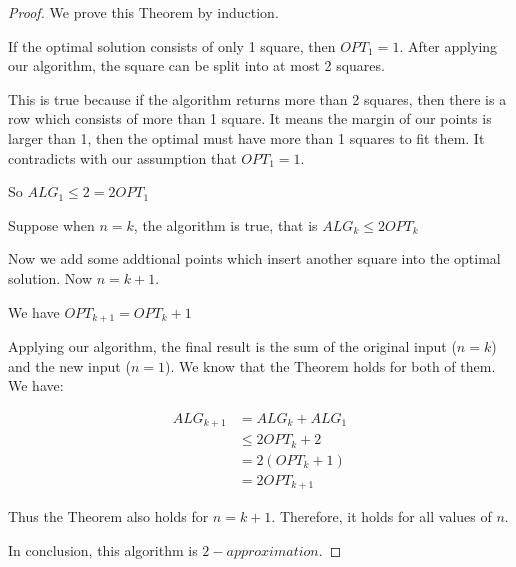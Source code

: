 \begin{proof}
  We prove this Theorem by induction.
  
  If the optimal solution consists of only 1 square, then $OPT_1 = 1$. After applying our algorithm, the square can be split into at most 2 squares.

  This is true because if the algorithm returns more than 2 squares, then there is a row which consists of more than 1 square. It means the margin of our points is larger than 1, then the optimal must have more than 1 squares to fit them. It contradicts with our assumption that $OPT_1 = 1$.
  
So $ALG_1 \leq 2 = 2OPT_1$

Suppose when $n = k$, the algorithm is true, that is $ALG_k \leq 2OPT_k$

Now we add some addtional points which insert another square into the optimal solution. Now $n = k + 1$.

We have $OPT_{k+1} = OPT_k + 1$

Applying our algorithm, the final result is the sum of the original input ($n = k$) and the new input ($n = 1$). We know that the Theorem holds for both of them. We have:

\begin{align*}
  ALG_{k + 1} &= ALG_k + ALG_1 \\
  &\leq 2OPT_k + 2  \\
  &= 2(OPT_k + 1)\\
  &= 2OPT_{k+1}
\end{align*}


Thus the Theorem also holds for $n = k + 1$. Therefore, it holds for all values of $n$.

  In conclusion, this algorithm is $2-approximation$.

\end{proof}
